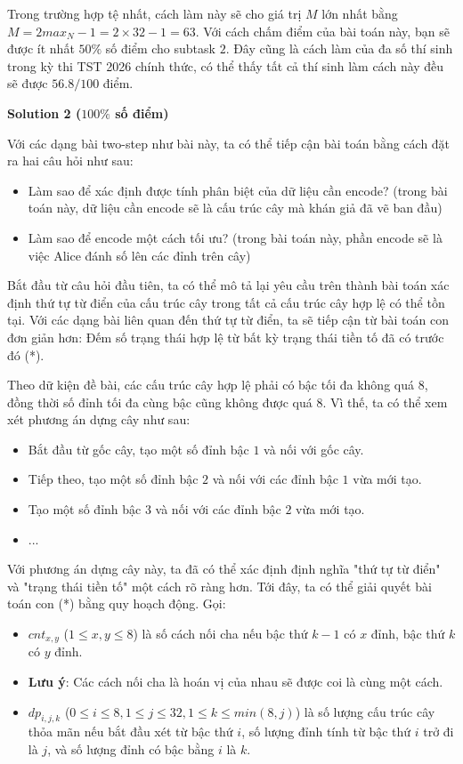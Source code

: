 Trong trường hợp tệ nhất, cách làm này sẽ cho giá trị $M$ lớn nhất bằng $M=2max_N-1=2\times 32-1=63$. Với cách chấm điểm của bài toán này, bạn sẽ được ít nhất $50\%$ số điểm cho subtask $2$. Đây cũng là cách làm của đa số thí sinh trong kỳ thi TST 2026 chính thức, có thể thấy tất cả thí sinh làm cách này đều sẽ được $56.8/100$ điểm.

\textbf{Solution 2 ($100\%$ số điểm)}

Với các dạng bài two-step như bài này, ta có thể tiếp cận bài toán bằng cách đặt ra hai câu hỏi như sau:
\begin{itemize}
   \item Làm sao để xác định được tính phân biệt của dữ liệu cần encode? (trong bài toán này, dữ liệu cần encode sẽ là cấu trúc cây mà khán giả đã vẽ ban đầu)
   \item Làm sao để encode một cách tối ưu? (trong bài toán này, phần encode sẽ là việc Alice đánh số lên các đỉnh trên cây)
\end{itemize}

Bắt đầu từ câu hỏi đầu tiên, ta có thể mô tả lại yêu cầu trên thành bài toán xác định thứ tự từ điển của cấu trúc cây trong tất cả cấu trúc cây hợp lệ có thể tồn tại. Với các dạng bài liên quan đến thứ tự từ điển, ta sẽ tiếp cận từ bài toán con đơn giản hơn: Đếm số trạng thái hợp lệ từ bất kỳ trạng thái tiền tố đã có trước đó (*).

Theo dữ kiện đề bài, các cấu trúc cây hợp lệ phải có bậc tối đa không quá $8$, đồng thời số đỉnh tối đa cùng bậc cũng không được quá $8$. Vì thế, ta có thể xem xét phương án dựng cây như sau:
\begin{itemize}
   \item Bắt đầu từ gốc cây, tạo một số đỉnh bậc $1$ và nối với gốc cây.
   \item Tiếp theo, tạo một số đỉnh bậc $2$ và nối với các đỉnh bậc $1$ vừa mới tạo.
   \item Tạo một số đỉnh bậc $3$ và nối với các đỉnh bậc $2$ vừa mới tạo.
   \item ...
\end{itemize}

Với phương án dựng cây này, ta đã có thể xác định định nghĩa "thứ tự từ điển" và "trạng thái tiền tố" một cách rõ ràng hơn. Tới đây, ta có thể giải quyết bài toán con (*) bằng quy hoạch động. Gọi:
\begin{itemize}
   \item $cnt_{x,y}$ ($1\le x,y\le 8$) là số cách nối cha nếu bậc thứ $k-1$ có $x$ đỉnh, bậc thứ $k$ có $y$ đỉnh.
   \item \textbf{Lưu ý}: Các cách nối cha là hoán vị của nhau sẽ được coi là cùng một cách.
   \item $dp_{i,j,k}$ ($0\le i\le 8,1\le j\le 32,1\le k\le min(8,j)$) là số lượng cấu trúc cây thỏa mãn nếu bắt đầu xét từ bậc thứ $i$, số lượng đỉnh tính từ bậc thứ $i$ trở đi là $j$, và số lượng đỉnh có bậc bằng $i$ là $k$.
\end{itemize}

